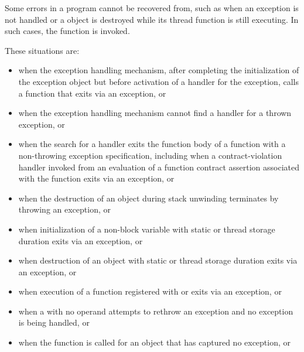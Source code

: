 \pnum
{}%
Some errors in a program cannot be recovered from, such as when an exception
is not handled or a  object is destroyed while its thread
function is still executing. In such cases,
the function  is invoked.
\begin{note}
These situations are:
%
\begin{itemize}
\item%
when the exception handling mechanism, after completing
the initialization of the exception object
but before
activation of a handler for the exception,
calls a function that exits
via an exception, or

\item%
when the exception handling mechanism cannot find a handler for a thrown exception, or

\item when the search for a handler
exits the function body of a function
with a non-throwing exception specification,
including when a contract-violation handler
invoked from an evaluation of
a function contract assertion associated with the function
exits via an exception,
or

\item%
when the destruction of an object during stack unwinding
terminates by throwing an exception, or

\item%
when initialization of a non-block
variable with static or thread storage duration
exits via an exception, or

\item%
when destruction of an object with static or thread storage duration exits
via an exception, or

\item%
when execution of a function registered with
 or 
exits via an exception, or

\item%
when a
with no operand attempts to rethrow an exception and no exception is being
handled, or

\item%
when the function  is called for an object
that has captured no exception, or


\end{itemize}
\end{note}

